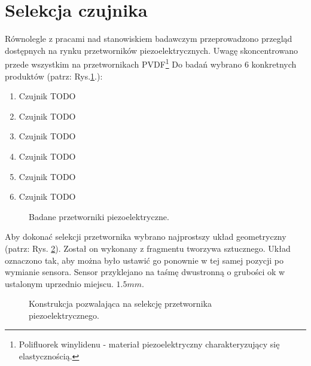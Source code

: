 \section{Selekcja czujnika}
\label{sec:sensor_selection}
Równolegle z pracami nad stanowiskiem badawczym przeprowadzono przegląd dostępnych na rynku przetworników piezoelektrycznych. Uwagę skoncentrowano przede wszystkim na przetwornikach PVDF\cite{PVDF:15}\footnote{Polifluorek winylidenu - materiał piezoelektryczny charakteryzujący się elastycznością.} Do badań wybrano 6 konkretnych produktów (patrz: Rys.\ref{fig:sensors}.):

\begin{enumerate}
\item Czujnik TODO
\item Czujnik TODO
\item Czujnik TODO
\item Czujnik TODO
\item Czujnik TODO
\item Czujnik TODO
\end{enumerate}


\begin{figure}[htbp]
\centering
{}%
\caption{Badane przetworniki piezoelektryczne.}
\label{fig:sensors}
\end{figure}

Aby dokonać selekcji przetwornika wybrano najprostszy układ geometryczny (patrz: Rys. \ref{fig:sensor_sel_geometry}). Został on wykonany z fragmentu tworzywa sztucznego. Układ oznaczono tak, aby można było ustawić go ponownie w tej samej pozycji po wymianie sensora. Sensor przyklejano na taśmę dwustronną o grubości ok w ustalonym uprzednio miejscu. $1.5mm$. 

\begin{figure}[htbp]
\centering
{}%
\caption{Konstrukcja pozwalająca na selekcję przetwornika piezoelektrycznego.}
\label{fig:sensor_sel_geometry}
\end{figure}

